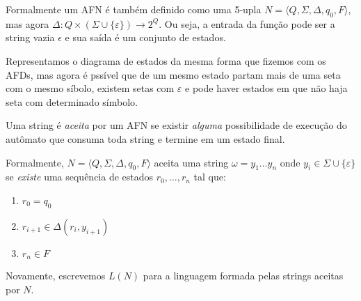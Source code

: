 Formalmente um AFN é também definido como uma 5-upla $N = \langle Q, \Sigma, \Delta, q_0, F \rangle$, mas agora $\Delta: Q \times (\Sigma \cup \{\varepsilon\}) \to 2^Q$.
Ou seja, a entrada da função pode ser a string vazia $\epsilon$ e sua saída é um conjunto de estados.

Representamos o diagrama de estados da mesma forma que fizemos com os AFDs, mas agora é pssível que de um mesmo estado partam mais de uma seta com o mesmo síbolo, existem setas com $\varepsilon$ e pode haver estados em que não haja seta com determinado símbolo.

Uma string é {\em aceita} por um AFN se existir {\em alguma} possibilidade de execução do autômato que consuma toda string e termine em um estado final.

Formalmente, $N = \langle Q, \Sigma, \Delta, q_0, F \rangle$ aceita uma string $\omega = y_1 \dots y_n$ onde $y_i \in \Sigma \cup \{\varepsilon\}$ se {\em existe} uma sequência de estados $r_0, \dots, r_n$ tal que:
\begin{enumerate}
\item $r_0 = q_0$
\item $r_{i+1} \in \Delta(r_i, y_{i+1})$
\item $r_n \in F$
\end{enumerate}

Novamente, escrevemos $L(N)$ para a linguagem formada pelas strings aceitas por $N$.


